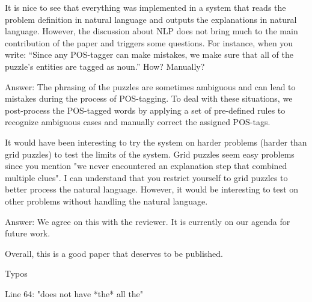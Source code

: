\documentclass{article}
\newcommand\comment[1]{\marginpar{\tiny #1}}
\renewcommand\comment[1]{#1}
\newcommand{\emilio}[1]{{\comment{Answer: \color{red}#1}}}
\newcommand{\new}[1]{{\comment{{\color{blue} #1}}}}
\begin{document}
\begin{quoteit}
It is nice to see that everything was implemented in a system that reads the problem definition in natural language and outputs the explanations in natural language. However, the discussion about NLP does not bring much to the main contribution of the paper and triggers some questions.
For instance, when you write: ``Since any POS-tagger can make mistakes, we make sure that all of the puzzle's entities are tagged as noun.'' How? Manually?
\end{quoteit}

\emilio{The phrasing of the puzzles are sometimes ambiguous and can lead to mistakes during the process of POS-tagging. To deal with these situations, we post-process the POS-tagged words by applying a set of pre-defined rules to recognize ambiguous cases and manually correct the assigned POS-tags.}

\begin{quoteit}
It would have been interesting to try the system on harder problems (harder than grid puzzles) to test the limits of the system.  Grid puzzles seem easy problems since you mention "we never encountered an explanation step that combined multiple clues".  I can understand that you restrict yourself to grid puzzles to better process the natural language. However, it would be interesting to test on other problems without handling the natural language.
\end{quoteit}

\emilio{We agree on this with the reviewer. It is currently on our agenda for future work.}

Overall, this is a good paper that deserves to be published. 

Typos

Line 64: "does not have *the* all the"
\end{document}
